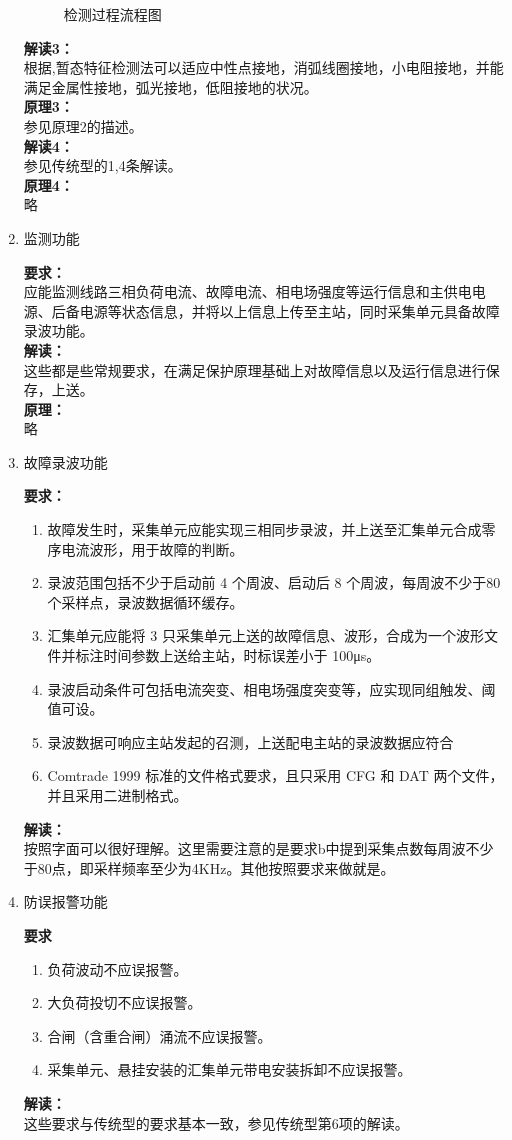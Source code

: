 \documentclass{article}
\begin{document}
\begin{CJK}{UTF8}{gbsn}
\begin{enumerate}
\begin{figure}[H]
		\caption{检测过程流程图}
		\end{figure}
		\textbf{解读3：}\\
		根据\cite{p1},暂态特征检测法可以适应中性点接地，消弧线圈接地，小电阻接地，并能满足金属性接地，弧光接地，低阻接地的状况。\\
		\textbf{原理3：}\\
		参见原理2的描述。\\
		\textbf{解读4：}\\
		参见传统型的1,4条解读。\\
		\textbf{原理4：}\\
		略
	\item 监测功能
		\par
		\textbf{要求：}\\
		应能监测线路三相负荷电流、故障电流、相电场强度等运行信息和主供电电源、后备电源等状态信息，并将以上信息上传至主站，同时采集单元具备故障录波功能。\\		\textbf{解读：}\\
		这些都是些常规要求，在满足保护原理基础上对故障信息以及运行信息进行保存，上送。\\
		\textbf{原理：}\\
		略
	\item 故障录波功能
		\par
		\textbf{要求：}
			\begin{enumerate}
				\item 故障发生时，采集单元应能实现三相同步录波，并上送至汇集单元合成零序电流波形，用于故障的判断。 
				\item 录波范围包括不少于启动前 4 个周波、启动后 8 个周波，每周波不少于80 个采样点，录波数据循环缓存。 
				\item 汇集单元应能将 3 只采集单元上送的故障信息、波形，合成为一个波形文件并标注时间参数上送给主站，时标误差小于 100μs。 
				\item 录波启动条件可包括电流突变、相电场强度突变等，应实现同组触发、阈值可设。 
				\item 录波数据可响应主站发起的召测，上送配电主站的录波数据应符合
				\item Comtrade 1999 标准的文件格式要求，且只采用 CFG 和 DAT 两个文件，并且采用二进制格式。 
		\end{enumerate}
		\textbf{解读：}\\
		按照字面可以很好理解。这里需要注意的是要求b中提到采集点数每周波不少于80点，即采样频率至少为4KHz。其他按照要求来做就是。
	\item 防误报警功能 
		\par
		\textbf{要求}
		\begin{enumerate}
		\item 负荷波动不应误报警。 
		\item 大负荷投切不应误报警。 
		\item 合闸（含重合闸）涌流不应误报警。 
		\item 采集单元、悬挂安装的汇集单元带电安装拆卸不应误报警。 
		\end{enumerate}
		\textbf{解读：}\\
		这些要求与传统型的要求基本一致，参见传统型第6项的解读。



\end{enumerate}
\end{CJK}
\end{document}

